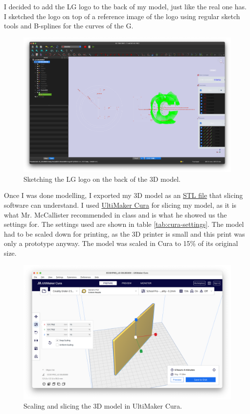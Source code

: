 \documentclass[12pt, letterpaper]{article}
\begin{document}
I decided to add the LG logo to the back of my model, just like the
real one has. I sketched the logo on top of a reference image of the
logo using regular sketch tools and B-splines for the curves of the G.

\begin{figure}[H]
  \medskip
  \centering
  \includegraphics[width=1\linewidth]{a4}
  \caption{Sketching the LG logo on the back of the 3D model.}
  \medskip
  \label{fig:a4}
\end{figure}

Once I was done modelling, I exported my 3D model as an
\href{https://drive.google.com/file/d/1JmbW4QBFge6CosMKm4P-QzFGuzJ4o9Oy/view?usp=sharing}{STL
file} that slicing software can understand. I used
\href{https://ultimaker.com/software/ultimaker-cura}{UltiMaker Cura}
for slicing my model, as it is what Mr. McCallister recommended in
class and is what he showed us the settings for. The settings used
are shown in table \ref{tab:cura-settings}. The model had to be
scaled down for printing, as the 3D printer is small and this print
was only a prototype anyway. The model was scaled in Cura to 15\% of
its original size.

\begin{figure}[H]
  \medskip
  \centering
  \includegraphics[width=1\linewidth]{a5-cura}
  \caption{Scaling and slicing the 3D model in UltiMaker Cura.}
  \medskip
  \label{fig:a5-cura}
\end{figure}
\end{document}
